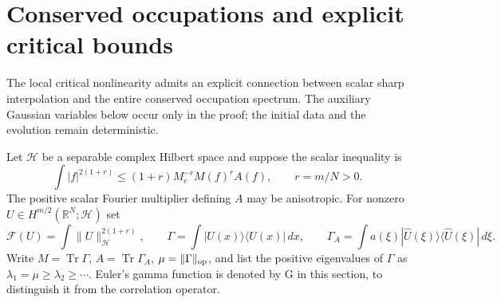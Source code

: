 \section{Conserved occupations and explicit critical bounds}
\label{sec:r13-occupations}

The local critical nonlinearity admits an explicit connection between
scalar sharp interpolation and the entire conserved occupation spectrum.
The auxiliary Gaussian variables below occur only in the proof; the
initial data and the evolution remain deterministic.

Let $\mathcal H$ be a separable complex Hilbert space and suppose the
scalar inequality is
\begin{equation}\label{eq:r13-scalarGN}
 \int |f|^{2(1+r)}\le (1+r)M_c^{-r}M(f)^r A(f),
 \qquad r=m/N>0.
\end{equation}
The positive scalar Fourier multiplier defining $A$ may be anisotropic.
For nonzero $U\in H^{m/2}(\mathbb R^N;\mathcal H)$ set
\[
 \mathcal F(U)=\int\|U\|_{\mathcal H}^{2(1+r)},\qquad
 \Gamma=\int|U(x)\rangle\langle U(x)|\,dx,\qquad
 \Gamma_A=\int a(\xi)|\widehat U(\xi)\rangle
                              \langle\widehat U(\xi)|\,d\xi.
\]
Write $M=\operatorname{Tr}\Gamma$, $A=\operatorname{Tr}\Gamma_A$,
$\mu=\|\Gamma\|_{\rm op}$, and list the positive eigenvalues of
$\Gamma$ as $\lambda_1=\mu\ge\lambda_2\ge\cdots$.
Euler's gamma function is denoted by $\mathrm G$ in this section, to
distinguish it from the correlation operator.

